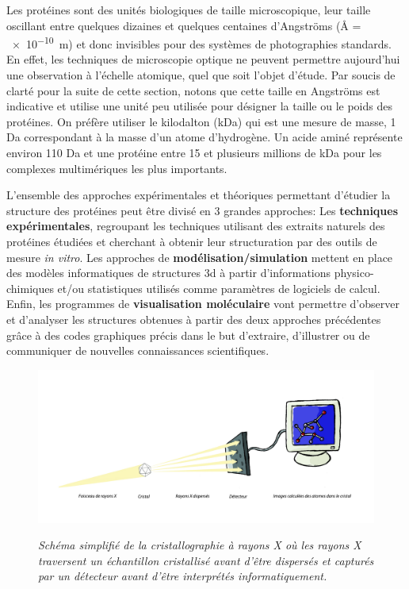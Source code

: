 Les protéines sont des unités biologiques de taille microscopique, leur taille oscillant entre quelques dizaines et quelques centaines d'Angströms (\r{A} = \SI{e-10}{\metre}) et donc invisibles pour des systèmes de photographies standards. En effet, les techniques de microscopie optique ne peuvent permettre aujourd'hui une observation à l'échelle atomique, quel que soit l'objet d'étude. Par soucis de clarté pour la suite de cette section, notons que cette taille en Angströms est indicative et utilise une unité peu utilisée pour désigner la taille ou le poids des protéines. On préfère utiliser le kilodalton (kDa) qui est une mesure de masse, 1 Da correspondant à la masse d'un atome d'hydrogène. Un acide aminé représente environ 110 Da et une protéine entre 15 et plusieurs millions de kDa pour les complexes multimériques les plus importants.

L'ensemble des approches expérimentales et théoriques permettant d'étudier la structure des protéines peut être divisé en 3 grandes approches: Les \textbf{techniques expérimentales}, regroupant les techniques utilisant des extraits naturels des protéines étudiées et cherchant à obtenir leur structuration par des outils de mesure \textit{in vitro}. Les approches de \textbf{modélisation/simulation} mettent en place des modèles informatiques de structures 3d à partir d'informations physico-chimiques et/ou statistiques utilisés comme paramètres de logiciels de calcul. Enfin, les programmes de \textbf{visualisation moléculaire} vont permettre d'observer et d'analyser les structures obtenues à partir des deux approches précédentes grâce à des codes graphiques précis dans le but d'extraire, d'illustrer ou de communiquer de nouvelles connaissances scientifiques.

\begin{figure}[h]
  \centering
  {\includegraphics[width=0.9\linewidth]{./figures/ch1/cristallographie_x_ray.pdf}}
    \caption{\it Schéma simplifié de la cristallographie à rayons X où les rayons X traversent un échantillon cristallisé avant d'être dispersés et capturés par un détecteur avant d'être interprétés informatiquement.}
    \label{Fig:cristallographie_x_ray}
  \hspace{0.2cm}
\end{figure}

